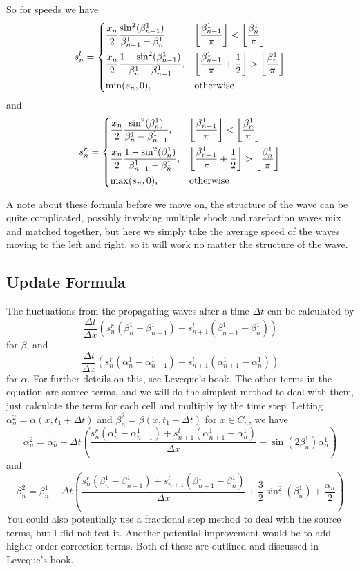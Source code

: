 \documentclass[12pt]{article}
\begin{document}
So for speeds we have
\[ s^l_n = \begin{dcases}
    \frac{x_n}{2} \frac{\sin^2(\beta_{n-1}^1)}{\beta_{n-1}^1 - \beta_n^1}, & \left\lfloor
    \frac{\beta_{n-1}^1}{\pi} \right\rfloor < \left\lfloor \frac{\beta_n^1}{\pi} \right\rfloor \\
    \frac{x_n}{2} \frac{1 - \sin^2(\beta_{n-1}^1)}{\beta_n^1 - \beta_{n-1}^1}, & \left\lfloor
    \frac{\beta_{n-1}^1}{\pi} + \frac{1}{2} \right\rfloor > \left\lfloor \frac{\beta_n^1}{\pi}
    \right\rfloor \\
    \min(s_n, 0), & \text{otherwise}
\end{dcases} \]
and
\[ s^r_n = \begin{dcases}
    \frac{x_n}{2} \frac{\sin^2(\beta_n^1)}{\beta_n^1 - \beta_{n-1}^1}, & \left\lfloor
    \frac{\beta_{n-1}^1}{\pi} \right\rfloor < \left\lfloor \frac{\beta_n^1}{\pi} \right\rfloor \\
    \frac{x_n}{2} \frac{1 - \sin^2(\beta_n^1)}{\beta_{n-1}^1 - \beta_n^1}, & \left\lfloor
    \frac{\beta_{n-1}^1}{\pi} + \frac{1}{2} \right\rfloor > \left\lfloor \frac{\beta_n^1}{\pi}
    \right\rfloor \\
    \max(s_n, 0), & \text{otherwise}
\end{dcases} \]

A note about these formula before we move on, the structure of the wave can be quite complicated,
possibly involving multiple shock and rarefaction waves mix and matched together, but here we simply
take the average speed of the waves moving to the left and right, so it will work no matter the
structure of the wave.

\subsection{Update Formula}

The fluctuations from the propagating waves after a time $\Delta t$ can be calculated by
\[ \frac{\Delta t}{\Delta x} (s^r_n (\beta_n^1 - \beta_{n-1}^1) + s^l_{n+1} (\beta_{n+1}^1 -
\beta_n^1)) \]
for $\beta$, and
\[ \frac{\Delta t}{\Delta x} (s^r_n (\alpha_n^1 - \alpha_{n-1}^1) + s^l_{n+1} (\alpha_{n+1}^1 -
\alpha_n^1)) \]
for $\alpha$. For further details on this, see Leveque's book. The other terms in the equation are
source terms, and we will do the simplest method to deal with them, just calculate the term for each
cell and multiply by the time step. Letting $\alpha_n^2 = \alpha(x,t_1 + \Delta t)$ and $\beta_n^2 =
\beta(x,t_1 + \Delta t)$ for $x \in C_n$, we have
\[ \alpha_n^2 = \alpha_n^1 - \Delta t \left( \frac{s^r_n (\alpha_n^1 - \alpha_{n-1}^1) + s^l_{n+1}
(\alpha_{n+1}^1 - \alpha_n^1)}{\Delta x} + \sin(2\beta_n^1)\alpha_n^1 \right) \]
and
\[ \beta_n^2 = \beta_n^1 - \Delta t \left( \frac{s^r_n (\beta_n^1 - \beta_{n-1}^1) + s^l_{n+1}
(\beta_{n+1}^1 - \beta_n^1)}{\Delta x} + \frac{3}{2}\sin^2(\beta_n^1) + \frac{\alpha_n}{2} \right)
\]
You could also potentially use a fractional step method to deal with the source terms, but I did not
test it. Another potential improvement would be to add higher order correction terms. Both of these
are outlined and discussed in Leveque's book.
\end{document}
